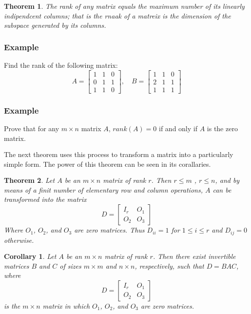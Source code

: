 \documentclass[10pt, oneside]{article}
\newtheorem{thm}{Theorem}
\newtheorem{cor}{Corollary}
\begin{document}
\begin{thm}
	The rank of any matrix equals the maximum number of its linearly indipendcent columns; that is the rnaak of a matreix is the dimension of the subspace generated by its columns.
\end{thm}

\subsubsection{Example}
Find the rank of the following matrix:
\[
	A = \begin{bmatrix} 1 & 1 & 0 \\ 0 & 1 & 1 \\ 1 & 1 & 0 \end{bmatrix}, \quad B = \begin{bmatrix} 1 & 1 & 0 \\ 2 & 1 & 1 \\ 1 & 1 & 1 \end{bmatrix}
\]

\subsubsection{Example}
Prove that for any $m \times n$ matrix $A$, $rank(A) = 0$ if and only if $A$ is the zero matrix.

The next theorem uses this process to transform a matrix into a particularly simple form. The power of this theorem can be seen in its corallaries.

\begin{thm}
	Let $A$ be an $m \times n$ matrix of rank $r$. Then $r \leq m$ , $r \leq n$, and by means of a finit number of elementary row and column operations, $A$ can be transformed into the matrix
	\[
		D = \begin{bmatrix} I_r & O_1 \\ O_2 & O_3 \end{bmatrix}
	\]
	Where $O_1$, $O_2$, and $O_3$ are zero matrices. Thus $D_{ii} = 1$ for $1 \leq i \leq r$ and $D_{ij} = 0$ otherwise.
\end{thm}

\begin{cor}
	Let $A$ be an $m \times n$ matrix of rank $r$. Then there exist invertible matrices $B$ and $C$ of sizes $m \times m$ and $n \times n$, respectively, such that $D = BAC$, where
	\[
		D = \begin{bmatrix} I_r & O_1 \\ O_2 & O_3 \end{bmatrix}
	\]
	is the $m \times n$ matrix in which $O_1$, $O_2$, and $O_3$ are zero matrices.
\end{cor}
\end{document}
